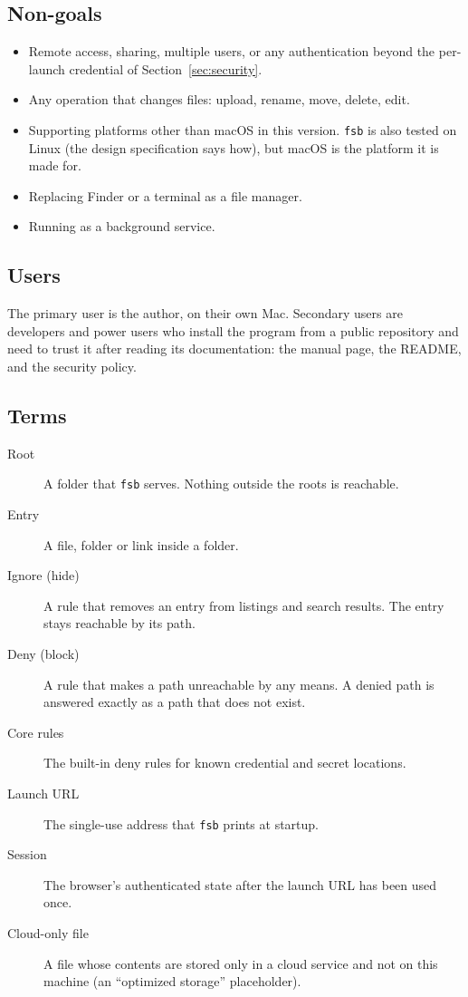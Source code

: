 \subsection{Non-goals}

\begin{itemize}
  \item Remote access, sharing, multiple users, or any authentication beyond the
        per-launch credential of Section~\ref{sec:security}.
  \item Any operation that changes files: upload, rename, move, delete, edit.
  \item Supporting platforms other than macOS in this version.  \texttt{fsb} is also
        tested on Linux (the design specification says how), but macOS is the platform
        it is made for.
  \item Replacing Finder or a terminal as a file manager.
  \item Running as a background service.
\end{itemize}

\subsection{Users}

The primary user is the author, on their own Mac.  Secondary users are developers
and power users who install the program from a public repository and need to trust
it after reading its documentation: the manual page, the README, and the security
policy.

\subsection{Terms}

\begin{description}
  \item[Root] A folder that \texttt{fsb} serves.  Nothing outside the roots is
        reachable.
  \item[Entry] A file, folder or link inside a folder.
  \item[Ignore (hide)] A rule that removes an entry from listings and search
        results.  The entry stays reachable by its path.
  \item[Deny (block)] A rule that makes a path unreachable by any means.  A denied
        path is answered exactly as a path that does not exist.
  \item[Core rules] The built-in deny rules for known credential and secret
        locations.
  \item[Launch URL] The single-use address that \texttt{fsb} prints at startup.
  \item[Session] The browser's authenticated state after the launch URL has been
        used once.
  \item[Cloud-only file] A file whose contents are stored only in a cloud service
        and not on this machine (an ``optimized storage'' placeholder).
\end{description}

